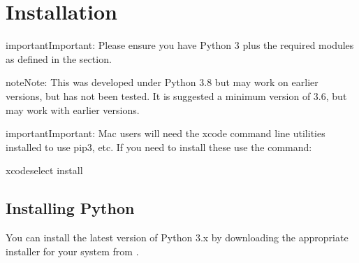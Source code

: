\documentclass[letterpaper,10pt,english]{sphinxmanual}
\begin{document}
\begin{sphinxVerbatim}[commandchars=\\\{\}]
 
 
 
 
 
 
\end{sphinxVerbatim}


\chapter{Installation}
\label{\detokenize{installation:installation}}\label{\detokenize{installation::doc}}
\begin{sphinxadmonition}{important}{Important:}
\sphinxAtStartPar
Please ensure you have Python 3 plus the required modules as defined in the
{\hyperref[\detokenize{requirements::doc}]{}} section.
\end{sphinxadmonition}

\begin{sphinxadmonition}{note}{Note:}
\sphinxAtStartPar
This was developed under Python 3.8 but may work on earlier versions, but
has not been tested. It is suggested a minimum version of 3.6, but may
work with earlier versions.
\end{sphinxadmonition}

\begin{sphinxadmonition}{important}{Important:}
\sphinxAtStartPar
Mac users will need the xcode command line utilities installed to use pip3, etc.
If you need to install these use the command:

\begin{sphinxVerbatim}[commandchars=\\\{\}]
\PYGZdl{} xcode\PYGZhy{}select \PYGZhy{}\PYGZhy{}install
\end{sphinxVerbatim}
\end{sphinxadmonition}


\section{Installing Python}
\label{\detokenize{installation:installing-python}}
\sphinxAtStartPar
You can install the latest version of Python 3.x by downloading the appropriate
installer for your system from .
\end{document}
